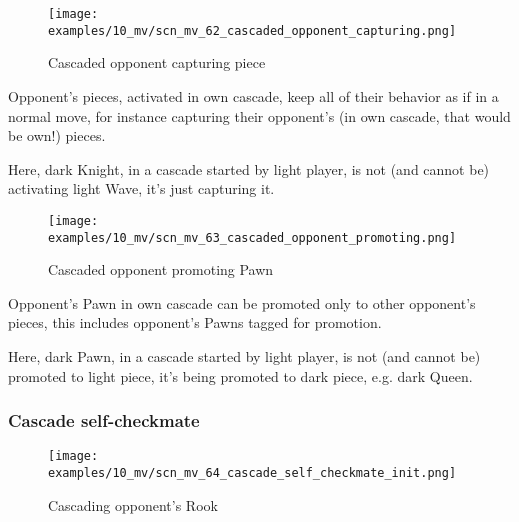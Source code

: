 
\clearpage %

\vspace*{-2.1\baselineskip}
\noindent
\begin{figure}[h]
\texttt{[image: examples/10\_mv/scn\_mv\_62\_cascaded\_opponent\_capturing.png]}
\caption{Cascaded opponent capturing piece}
\label{fig:scn_mv_62_cascaded_opponent_capturing}
\end{figure}

Opponent's pieces, activated in own cascade, keep all of their behavior as if in a
normal move, for instance capturing their opponent's (in own cascade, that would be
own!) pieces.

Here, dark Knight, in a cascade started by light player, is not (and cannot be)
activating light Wave, it's just capturing it.

\clearpage %

\vspace*{-2.1\baselineskip}
\noindent
\begin{figure}[h]
\texttt{[image: examples/10\_mv/scn\_mv\_63\_cascaded\_opponent\_promoting.png]}
\caption{Cascaded opponent promoting Pawn}
\label{fig:scn_mv_63_cascaded_opponent_promoting}
\end{figure}

Opponent's Pawn in own cascade can be promoted only to other opponent's pieces,
this includes opponent's Pawns tagged for promotion.

Here, dark Pawn, in a cascade started by light player, is not (and cannot be)
promoted to light piece, it's being promoted to dark piece, e.g. dark Queen.

\clearpage %

\subsubsection*{Cascade self-checkmate}
\label{sec:Miranda's veil/Wave/Cascading opponent/Cascade self-checkmate}

\vspace*{-1.5\baselineskip}
\noindent
\begin{figure}[h]
\texttt{[image: examples/10\_mv/scn\_mv\_64\_cascade\_self\_checkmate\_init.png]}
\vspace*{-1.4\baselineskip}
\caption{Cascading opponent's Rook}
\label{fig:scn_mv_64_cascade_self_checkmate_init}
\end{figure}

